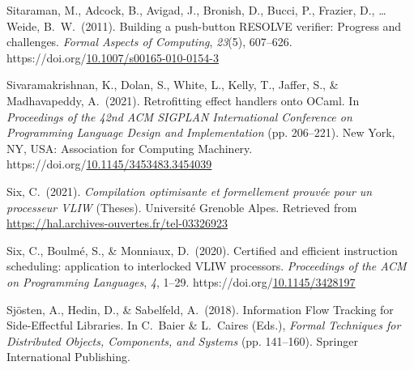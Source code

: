 \documentclass[12pt,twoside]{article}
\begin{document}
{\begin{thebibliography}{1079}
\mdbibitemlabel{}Sitaraman, M., Adcock, B., Avigad, J., Bronish, D., Bucci, P., Frazier, D., … Weide, B.~W.~(2011). Building a push-button RESOLVE verifier: Progress and challenges. \emph{Formal Aspects of Computing}, \emph{23}(5), 607–626. https://doi.org/\href{https://dx.doi.org/10.1007/s00165-010-0154-3}{10.1007/s00165-010-0154-3}%

\mdbibitemlabel{}Sivaramakrishnan, K., Dolan, S., White, L., Kelly, T., Jaffer, S., \& Madhavapeddy, A.~(2021). Retrofitting effect handlers onto OCaml. In \emph{Proceedings of the 42nd ACM SIGPLAN International Conference on Programming Language Design and Implementation} (pp. 206–221). New York, NY, USA: Association for Computing Machinery. https://doi.org/\href{https://dx.doi.org/10.1145/3453483.3454039}{10.1145/3453483.3454039}%

\mdbibitemlabel{}Six, C.~(2021). \emph{Compilation optimisante et formellement prouvée pour un processeur VLIW} (Theses). Université Grenoble Alpes. Retrieved from \href{https://hal.archives-ouvertes.fr/tel-03326923}{{\ttfamily https://\hspace{0pt}hal.\hspace{0pt}archives-\hspace{0pt}ouvertes.\hspace{0pt}fr/\hspace{0pt}tel-\hspace{0pt}03326923}}%

\mdbibitemlabel{}Six, C., Boulmé, S., \& Monniaux, D.~(2020). Certified and efficient instruction scheduling: application to interlocked VLIW processors. \emph{Proceedings of the ACM on Programming Languages}, \emph{4}, 1–29. https://doi.org/\href{https://dx.doi.org/10.1145/3428197}{10.1145/3428197}%

\mdbibitemlabel{}Sjösten, A., Hedin, D., \& Sabelfeld, A.~(2018). Information Flow Tracking for Side-Effectful Libraries. In C.~Baier \& L.~Caires (Eds.), \emph{Formal Techniques for Distributed Objects, Components, and Systems} (pp. 141–160). Springer International Publishing.%


\end{thebibliography}}
\end{document}

